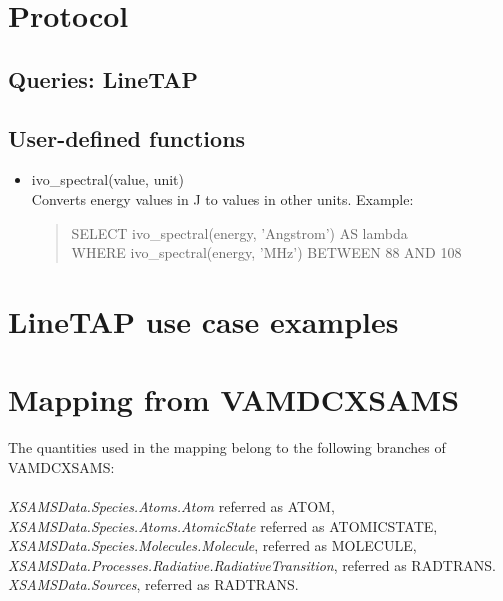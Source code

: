 \documentclass[11pt,a4paper]{ivoa}
\begin{document}
\section{Protocol }
\label{sec:Protocol}
\subsection{ Queries: LineTAP }

\subsection{User-defined functions}

\begin{itemize}
\item ivo\_spectral(value, unit)\\
Converts energy values in J to values in other units. Example:\\
\begin{quote}
SELECT ivo\_spectral(energy, 'Angstrom') AS lambda \\
 WHERE ivo\_spectral(energy, 'MHz') BETWEEN 88 AND 108
\end{quote}

\end{itemize}




\section{LineTAP use case examples}


\section{Mapping from VAMDCXSAMS}

The quantities used in the mapping belong to the following branches of VAMDCXSAMS:\\
\\
\textit{XSAMSData.Species.Atoms.Atom}  referred as ATOM,\\
\textit{XSAMSData.Species.Atoms.AtomicState}  referred as ATOMICSTATE,\\
\textit{XSAMSData.Species.Molecules.Molecule}, referred as MOLECULE,\\
\textit{XSAMSData.Processes.Radiative.RadiativeTransition}, referred as RADTRANS.\\
\textit{XSAMSData.Sources}, referred as RADTRANS.\\
\end{document}
